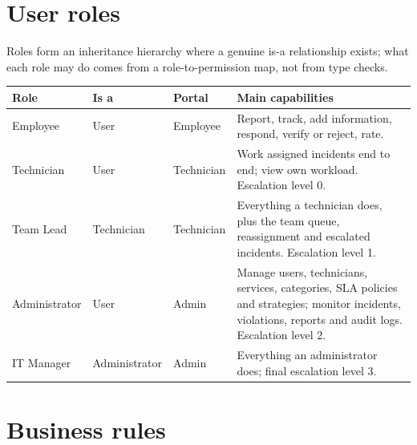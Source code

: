\section{User roles}

Roles form an inheritance hierarchy where a genuine is-a relationship exists; what each role
may do comes from a role-to-permission map, not from type checks.

\noindent\begin{tabularx}{\textwidth}{@{}lll>{\raggedright\arraybackslash}X@{}}
\toprule
\textbf{Role} & \textbf{Is a} & \textbf{Portal} & \textbf{Main capabilities} \\
\midrule
Employee & User & Employee & Report, track, add information, respond, verify or reject, rate. \\
Technician & User & Technician & Work assigned incidents end to end; view own workload.
  Escalation level 0. \\
Team Lead & Technician & Technician & Everything a technician does, plus the team queue,
  reassignment and escalated incidents. Escalation level 1. \\
Administrator & User & Admin & Manage users, technicians, services, categories, SLA policies
  and strategies; monitor incidents, violations, reports and audit logs. Escalation level 2. \\
IT Manager & Administrator & Admin & Everything an administrator does; final escalation level 3. \\
\bottomrule
\end{tabularx}

\section{Business rules}

